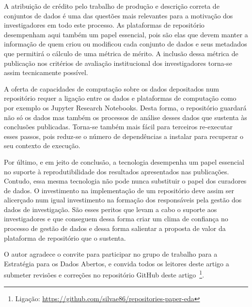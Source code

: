 \documentclass[sigconf,nonacm]{acmart}
\begin{document}
A atribuição de crédito pelo trabalho de produção e descrição correta de conjuntos de dados é uma das questões mais relevantes para a motivação dos investigadores em todo este processo. As plataformas de repositório desempenham aqui também um papel essencial, pois são elas que devem manter a informação de quem criou ou modificou cada conjunto de dados e seus metadados que permitirá o cálculo de uma métrica de mérito. A inclusão dessa métrica de publicação nos critérios de avaliação institucional dos investigadores torna-se assim tecnicamente possível.

A oferta de capacidades de computação sobre os dados depositados num repositório requer a ligação entre os dados e plataformas de computação como por exemplo os Jupyter Research Notebooks. Desta forma, o repositório guardará não só os dados mas também os processos de análise desses dados que sustenta às conclusões publicadas. Torna-se também mais fácil para terceiros re-executar esses passos, pois reduz-se o número de dependências a instalar para recuperar o seu contexto de execução.

Por último, e em jeito de conclusão, a tecnologia desempenha um papel essencial no suporte à reprodutibilidade dos resultados apresentados nas publicações. Contudo, essa mesma tecnologia não pode nunca substituir o papel dos curadores de dados. O investimento na implementação de um repositório deve assim ser alicerçado num igual investimento na formação dos responsáveis pela gestão dos dados de investigação. São esses peritos que levam a cabo o suporte aos investigadores e que conseguem dessa forma criar um clima de confiança no processo de gestão de dados e dessa forma salientar a proposta de valor da plataforma de repositório que o sustenta.


\begin{acks}
O autor agradece o convite para participar no grupo de trabalho para a Estratégia para os Dados Abertos, e convida todos os leitores deste artigo a submeter revisões e correções no repositório GitHub deste artigo~\footnote{Ligação: \url{https://github.com/silvae86/repositories-paper-eda}}.
\end{acks}





\printglossary[type=\acronymtype]
\printglossary
\end{document}
